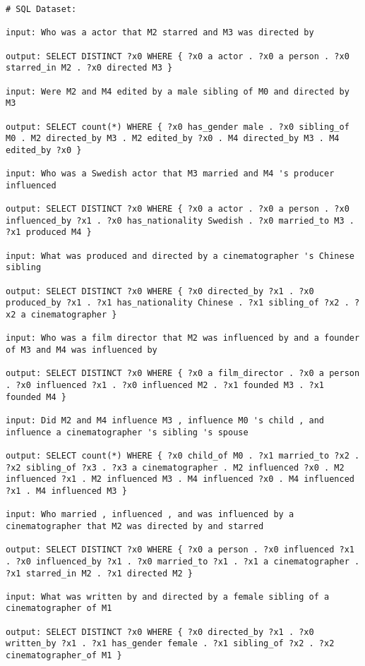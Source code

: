 \documentclass{article} \usepackage{iclr2022_conference,times}
\begin{document}
\begin{lstlisting}
# SQL Dataset:

input: Who was a actor that M2 starred and M3 was directed by

output: SELECT DISTINCT ?x0 WHERE { ?x0 a actor . ?x0 a person . ?x0 starred_in M2 . ?x0 directed M3 }

input: Were M2 and M4 edited by a male sibling of M0 and directed by M3

output: SELECT count(*) WHERE { ?x0 has_gender male . ?x0 sibling_of M0 . M2 directed_by M3 . M2 edited_by ?x0 . M4 directed_by M3 . M4 edited_by ?x0 }

input: Who was a Swedish actor that M3 married and M4 's producer influenced

output: SELECT DISTINCT ?x0 WHERE { ?x0 a actor . ?x0 a person . ?x0 influenced_by ?x1 . ?x0 has_nationality Swedish . ?x0 married_to M3 . ?x1 produced M4 }

input: What was produced and directed by a cinematographer 's Chinese sibling

output: SELECT DISTINCT ?x0 WHERE { ?x0 directed_by ?x1 . ?x0 produced_by ?x1 . ?x1 has_nationality Chinese . ?x1 sibling_of ?x2 . ?x2 a cinematographer }

input: Who was a film director that M2 was influenced by and a founder of M3 and M4 was influenced by

output: SELECT DISTINCT ?x0 WHERE { ?x0 a film_director . ?x0 a person . ?x0 influenced ?x1 . ?x0 influenced M2 . ?x1 founded M3 . ?x1 founded M4 }

input: Did M2 and M4 influence M3 , influence M0 's child , and influence a cinematographer 's sibling 's spouse

output: SELECT count(*) WHERE { ?x0 child_of M0 . ?x1 married_to ?x2 . ?x2 sibling_of ?x3 . ?x3 a cinematographer . M2 influenced ?x0 . M2 influenced ?x1 . M2 influenced M3 . M4 influenced ?x0 . M4 influenced ?x1 . M4 influenced M3 }

input: Who married , influenced , and was influenced by a cinematographer that M2 was directed by and starred

output: SELECT DISTINCT ?x0 WHERE { ?x0 a person . ?x0 influenced ?x1 . ?x0 influenced_by ?x1 . ?x0 married_to ?x1 . ?x1 a cinematographer . ?x1 starred_in M2 . ?x1 directed M2 }

input: What was written by and directed by a female sibling of a cinematographer of M1

output: SELECT DISTINCT ?x0 WHERE { ?x0 directed_by ?x1 . ?x0 written_by ?x1 . ?x1 has_gender female . ?x1 sibling_of ?x2 . ?x2 cinematographer_of M1 }


\end{lstlisting}
\end{document}
